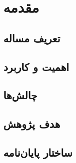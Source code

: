 \chapter{مقدمه}\label{Chap:Chap1}
\minitoc

\section{تعریف مساله}

\section{اهمیت و کاربرد}

\section{چالش‌ها}

\section{هدف پژوهش}


\section{ساختار پایان‌نامه}




